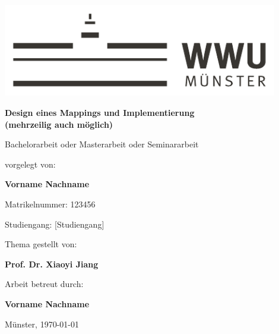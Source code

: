 \begin{centering}
\vspace*{\fill}
\includegraphics[width=12cm]{./img/wwu-logo-neu.pdf}

\vspace{2cm} 

{\LARGE
	\textbf{Design eines Mappings und Implementierung\\
			(mehrzeilig auch möglich)}\\[1.2cm]
}

{\large
	Bachelorarbeit oder Masterarbeit oder Seminararbeit\\[2cm]
}

{\large
	vorgelegt von:
}

{ \Large
	\textbf{Vorname Nachname}\\[1cm]
}

{\large
	Matrikelnummer: 123456\\[2mm]
}

{\large
	Studiengang: [Studiengang]\\[1cm]
}
    
{\large
	Thema gestellt von:
}

{\Large
	\textbf{Prof. Dr. Xiaoyi Jiang}\\[1cm]
}
                               
{\large
	Arbeit betreut durch:
}

{\Large
	\textbf{Vorname Nachname}\\[1cm]
}

{\large
Münster, \today
}
\vfill
\end{centering}
